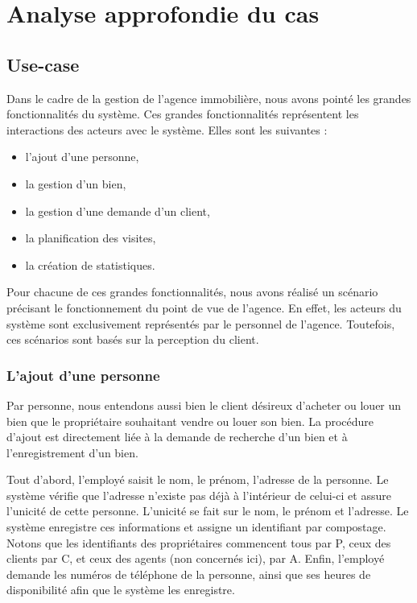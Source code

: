 \section{Analyse approfondie du cas}

\subsection{Use-case}
Dans le cadre de la gestion de l'agence immobilière, nous avons pointé les grandes fonctionnalités du système. Ces grandes fonctionnalités représentent les interactions des acteurs avec le système.
Elles sont les suivantes :
\begin{itemize}
	\item l'ajout d'une personne,
	\item la gestion d'un bien,
	\item la gestion d'une demande d'un client,
	\item la planification des visites,
	\item la création de statistiques.
\end{itemize}
Pour chacune de ces grandes fonctionnalités, nous avons réalisé un scénario précisant le fonctionnement du point de vue de l'agence. En effet, les acteurs du système sont exclusivement représentés par le personnel de l'agence.
Toutefois, ces scénarios sont basés sur la perception du client.

\subsubsection{L'ajout d'une personne}
Par personne, nous entendons aussi bien le client désireux d'acheter ou louer un bien que le propriétaire souhaitant vendre ou louer son bien.
La procédure d'ajout est directement liée à la demande de recherche d'un bien et à l'enregistrement d'un bien.

Tout d'abord, l'employé saisit le nom, le prénom, l'adresse de la personne.
Le système vérifie que l'adresse n'existe pas déjà à l'intérieur de celui-ci et assure l'unicité de cette personne. L'unicité se fait sur le nom, le prénom et l'adresse.
Le système enregistre ces informations et assigne un identifiant par compostage. Notons que les identifiants des propriétaires commencent tous par P, ceux des clients par C, et ceux des agents (non concernés ici), par A.
Enfin, l'employé demande les numéros de téléphone de la personne, ainsi que ses heures de disponibilité afin que le système les enregistre.

